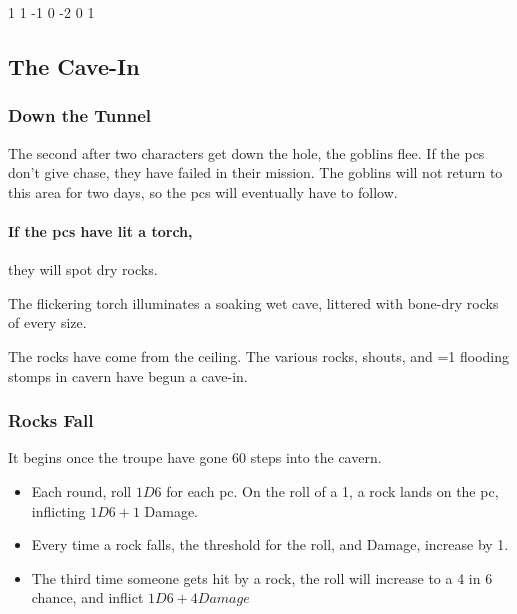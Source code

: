 \begin{multicols}{2}
{1}%
{1}%
{{-1}%
{0}%
{-2}}%
{0}%
{1}%
{}%
{\Dagger}%
{
  \setcounter{Combat}{1}
  \setcounter{Brawl}{2}
  \setcounter{Caving}{1}
  \setcounter{Tactics}{1}
}

\subsection{The Cave-In}

\subsubsection{Down the Tunnel}
The second after two characters get down the hole, the goblins flee.
If the \glspl{pc} don't give chase, they have failed in their mission.
The goblins will not return to this area for two days, so the \glspl{pc} will eventually have to follow.

\paragraph{If the \glspl{pc} have lit a torch,}
they will spot dry rocks.

\begin{boxtext}
  The flickering torch illuminates a soaking wet cave, littered with bone-dry rocks of every size.
\end{boxtext}

The rocks have come from the ceiling.
The various rocks, shouts, and \ifnum\value{temperature}=1 flooding \else stomps \fi in cavern have begun a cave-in.

\subsubsection{Rocks Fall}

It begins once the troupe have gone 60 steps into the cavern.

\begin{itemize}
  \item
  Each round, roll $1D6$ for each \gls{pc}.
  On the roll of a 1, a rock lands on the \gls{pc}, inflicting $1D6+1$ Damage.
  \item
  Every time a rock falls, the threshold for the roll, and Damage, increase by 1.
  \item
  The third time someone gets hit by a rock, the roll will increase to a 4 in 6 chance, and inflict $1D6+4 Damage$
\end{itemize}


\end{multicols}
